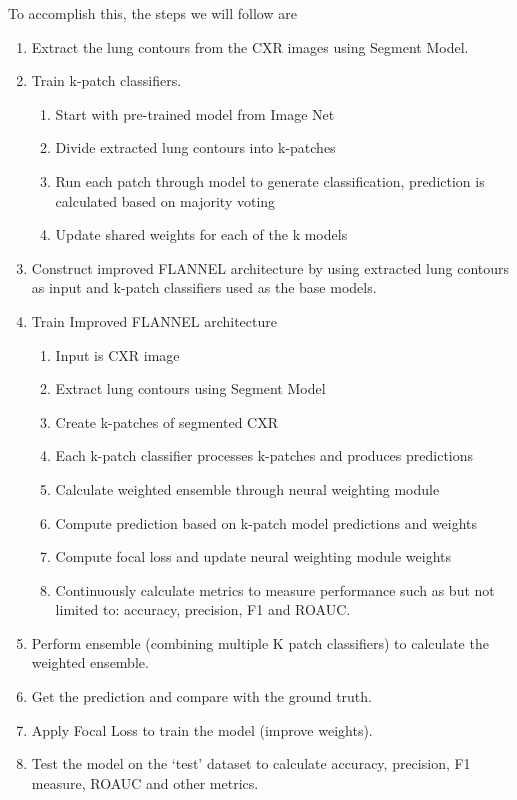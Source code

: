 \documentclass{sigkddExp}
\begin{document}
To accomplish this, the steps we will follow are

\begin{enumerate}
    \item Extract the lung contours from the CXR images using Segment Model.
    \item Train k-patch classifiers.
          \begin{enumerate}
              \item Start with pre-trained model from Image Net
              \item Divide extracted lung contours into k-patches
              \item Run each patch through model to generate classification,
                    prediction is calculated based on majority voting
              \item Update shared weights for each of the k models
          \end{enumerate}
    \item Construct improved FLANNEL architecture by using extracted lung
          contours as input and k-patch classifiers used as the base models.
    \item Train Improved FLANNEL architecture
          \begin{enumerate}
              \item Input is CXR image
              \item Extract lung contours using Segment Model
              \item Create k-patches of segmented CXR
              \item Each k-patch classifier processes k-patches and produces predictions
              \item Calculate weighted ensemble through neural weighting module
              \item Compute prediction based on k-patch model predictions and weights
              \item Compute focal loss and update neural weighting module weights
              \item Continuously calculate metrics to measure performance such as but
                    not limited to: accuracy, precision, F1 and ROAUC.
          \end{enumerate}
    \item Perform ensemble (combining multiple K patch classifiers) to calculate the weighted ensemble.
    \item Get the prediction and compare with the ground truth.
    \item Apply Focal Loss to train the model (improve weights).
    \item Test the model on the ‘test’ dataset to calculate accuracy, precision, F1 measure, ROAUC and other metrics.
\end{enumerate}
\end{document}
